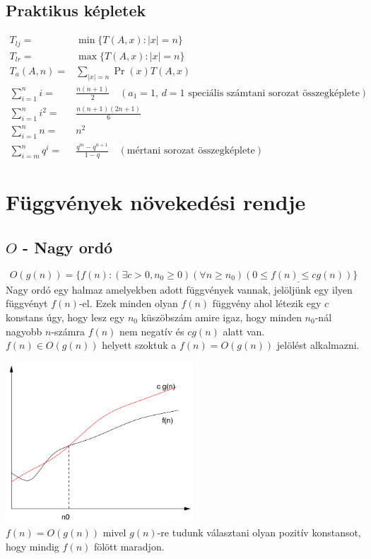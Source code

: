 \documentclass{article}
\theoremstyle{mytheoremstyle}
\theoremstyle{mytheoremstyle}
\theoremstyle{myproblemstyle}
\begin{document}
\subsection{Praktikus képletek}
\begin{align*}
    T_{lj}=            & \min \{T(A,x):|x|=n\}                                                                 \\
    T_{lr}=            & \max\{T(A,x):|x|=n\}                                                                  \\
    T_a(A,n)=          & \sum_{|x|=n}\Pr(x)T(A,x)                                                              \\
    \sum_{i=1}^{n}i=   & \frac{n(n+1)}{2}\quad(\text{$a_1=1$, $d=1$ speciális számtani sorozat összegképlete}) \\
    \sum_{i=1}^{n}i^2= & \frac{n(n+1)(2n+1)}{6}                                                                \\
    \sum_{i=1}^{n}n=   & n^2                                                                                   \\
    \sum_{i=m}^{n}q^i= & \frac{q^m-q^{n+1}}{1-q}\quad(\text{mértani sorozat összegképlete})
\end{align*}

\section{Függvények növekedési rendje}
\subsection{$O$ - Nagy ordó}
\[O(g(n))=\{f(n):(\exists c>0, n_0 \geq 0)(\forall n \geq n_0)
    \underline{(0 \leq f(n) \leq c g(n))}\}\]
Nagy ordó egy halmaz amelyekben adott függvények vannak, jelöljünk
egy ilyen függvényt  $f(n)$-el.
Ezek minden olyan $f(n)$ függvény ahol létezik egy $c$ konstans úgy,
 hogy lesz egy $n_0$
küszöbszám amire igaz, hogy minden $n_0$-nál nagyobb $n$-számra $f(n)$ nem negatív
és $cg(n)$ alatt van.\\
$f(n)\in O(g(n))$ helyett szoktuk a $f(n)=O(g(n))$ jelölést alkalmazni.

\begin{center}
    \includegraphics[height=6cm]{o}
    \\
    $f(n)=O(g(n))$ mivel $g(n)$-re tudunk választani olyan pozitív konstansot,
    hogy mindig $f(n)$ fölött maradjon.
\end{center}
\end{document}
